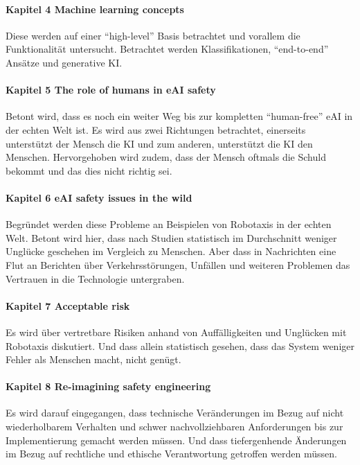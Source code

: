 \paragraph{Kapitel 4 Machine learning concepts}
Diese werden auf einer ``high-level'' Basis betrachtet und vorallem die Funktionalität untersucht. 
Betrachtet werden Klassifikationen, ``end-to-end'' Ansätze und generative KI.

\paragraph{Kapitel 5 The role of humans in eAI safety}
Betont wird, dass es noch ein weiter Weg bis zur kompletten ``human-free'' eAI in der echten Welt ist. 
Es wird aus zwei Richtungen betrachtet, einerseits unterstützt der Mensch die KI und zum anderen, unterstützt die KI den Menschen. 
Hervorgehoben wird zudem, dass der Mensch oftmals die Schuld bekommt und das dies nicht richtig sei.

\paragraph{Kapitel 6 eAI safety issues in the wild}
Begründet werden diese Probleme an Beispielen von Robotaxis in der echten Welt. Betont wird hier, 
dass nach Studien statistisch im Durchschnitt weniger Unglücke geschehen im Vergleich zu Menschen. 
Aber dass in Nachrichten eine Flut an Berichten über Verkehrsstörungen, Unfällen und weiteren Problemen 
das Vertrauen in die Technologie untergraben.

\paragraph{Kapitel 7 Acceptable risk}
Es wird über vertretbare Risiken anhand von Auffälligkeiten und Unglücken mit Robotaxis diskutiert. 
Und dass allein statistisch gesehen, dass das System weniger Fehler als Menschen macht, nicht genügt.

\paragraph{Kapitel 8 Re-imagining safety engineering}
Es wird darauf eingegangen, dass technische Veränderungen im Bezug auf nicht wiederholbarem Verhalten und schwer nachvollziehbaren 
Anforderungen bis zur Implementierung gemacht werden müssen. Und dass tiefergenhende 
Änderungen im Bezug auf rechtliche und ethische Verantwortung getroffen werden müssen.

